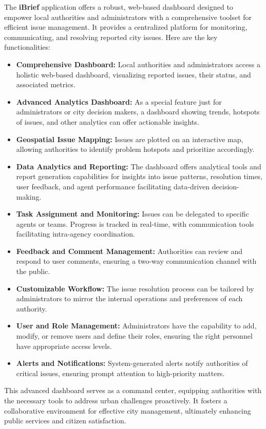 The \textbf{iBrief} application offers a robust, web-based dashboard designed to empower local authorities and administrators with a comprehensive toolset for efficient issue management. It provides a centralized platform for monitoring, communicating, and resolving reported city issues. Here are the key functionalities:

\begin{itemize}
    \item \textbf{Comprehensive Dashboard:}
    Local authorities and administrators access a holistic web-based dashboard, visualizing reported issues, their status, and associated metrics.

    \item \textbf{Advanced Analytics Dashboard:} As a special feature just for administrators or city decision makers, a dashboard showing trends, hotspots of issues, and other analytics can offer actionable insights.
    
    \item \textbf{Geospatial Issue Mapping:}
    Issues are plotted on an interactive map, allowing authorities to identify problem hotspots and prioritize accordingly.
    
    \item \textbf{Data Analytics and Reporting:}
    The dashboard offers analytical tools and report generation capabilities for insights into issue patterns, resolution times, user feedback, and agent performance facilitating data-driven decision-making.
    
    \item \textbf{Task Assignment and Monitoring:}
    Issues can be delegated to specific agents or teams. Progress is tracked in real-time, with communication tools facilitating intra-agency coordination.
    
    \item \textbf{Feedback and Comment Management:}
    Authorities can review and respond to user comments, ensuring a two-way communication channel with the public.
    
    \item \textbf{Customizable Workflow:}
    The issue resolution process can be tailored by administrators to mirror the internal operations and preferences of each authority.
    
    \item \textbf{User and Role Management:}
    Administrators have the capability to add, modify, or remove users and define their roles, ensuring the right personnel have appropriate access levels.
    
    \item \textbf{Alerts and Notifications:}
    System-generated alerts notify authorities of critical issues, ensuring prompt attention to high-priority matters.
\end{itemize}

This advanced dashboard serves as a command center, equipping authorities with the necessary tools to address urban challenges proactively. It fosters a collaborative environment for effective city management, ultimately enhancing public services and citizen satisfaction.